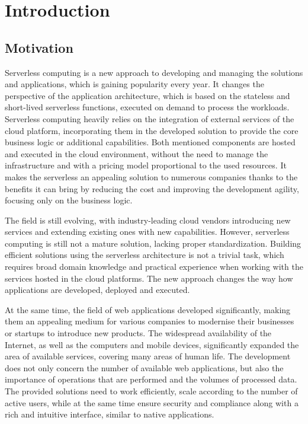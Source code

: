 \chapter{Introduction}

\section{Motivation}

Serverless computing is a new approach to developing and managing the solutions and applications, which is gaining popularity every year.
It changes the perspective of the application architecture, which is based on the stateless and short-lived serverless functions, executed on demand to process the workloads.
Serverless computing heavily relies on the integration of external services of the cloud platform, incorporating them in the developed solution to provide the core business logic or additional capabilities.
Both mentioned components are hosted and executed in the cloud environment, without the need to manage the infrastructure and with a pricing model proportional to the used resources.
It makes the serverless an appealing solution to numerous companies thanks to the benefits it can bring by reducing the cost and improving the development agility, focusing only on the business logic.

The field is still evolving, with industry-leading cloud vendors introducing new services and extending existing ones with new capabilities.
However, serverless computing is still not a mature solution, lacking proper standardization.
Building efficient solutions using the serverless architecture is not a trivial task, which requires broad domain knowledge and practical experience when working with the services hosted in the cloud platforms.
The new approach changes the way how applications are developed, deployed and executed.

At the same time, the field of web applications developed significantly, making them an appealing medium for various companies to modernise their businesses or startups to introduce new products.
The widespread availability of the Internet, as well as the computers and mobile devices, significantly expanded the area of available services, covering many areas of human life.
The development does not only concern the number of available web applications, but also the importance of operations that are performed and the volumes of processed data.
The provided solutions need to work efficiently, scale according to the number of active users, while at the same time ensure security and compliance along with a rich and intuitive interface, similar to native applications.

